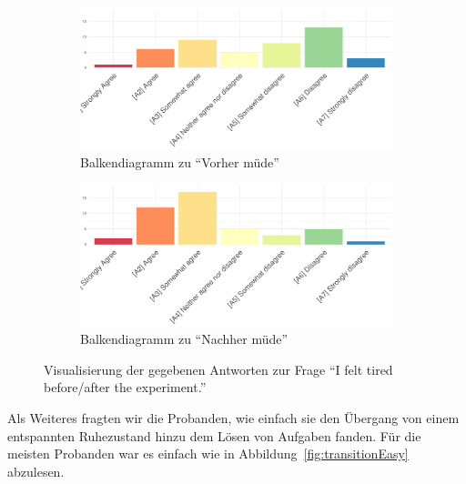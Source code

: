\begin{figure}[H]
	\centering
	\begin{subfigure}{0.48\textwidth}
		\includegraphics[width=\textwidth]{./_StudyResults/tiredBefore}
		\caption{Balkendiagramm zu "`Vorher müde"'}
		\label{fig:tiredBefore}
	\end{subfigure}
	\hfill
	\begin{subfigure}{0.48\textwidth}
		\includegraphics[width=\textwidth]{./_StudyResults/tiredAfter}
		\caption{Balkendiagramm zu "`Nachher müde"'}
		\label{fig:tiredAfter}
	\end{subfigure}
	\caption{Visualisierung der gegebenen Antworten zur Frage "`I felt tired before/after the experiment."'} %
\end{figure}

Als Weiteres fragten wir die Probanden, wie einfach sie den Übergang von einem entspannten Ruhezustand hinzu dem Lösen von Aufgaben fanden. Für die meisten Probanden war es einfach wie in Abbildung~\ref{fig:transitionEasy} abzulesen.

